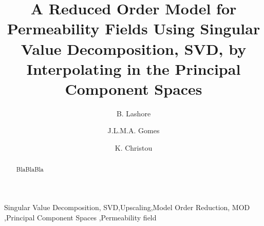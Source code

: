 \documentclass[preprint,12pt]{elsarticle}
\begin{document}
\begin{frontmatter}



\title{A Reduced Order Model for Permeability Fields Using Singular Value Decomposition, SVD, by Interpolating in the Principal Component Spaces}
\author[UoA]{B. Lashore} \author[UoA]{J.L.M.A. Gomes} \author[UoA]{K. Christou}
\address[UoA]{Mechanics of Fluids, Soils \& Structures Group, School of Engineering, University of Aberdeen, UK}


\begin{abstract}
  BlaBlaBla
\end{abstract}



\begin{keyword} %
Singular Value Decomposition, SVD\sep Upscaling\sep Model Order Reduction, MOD \sep  Principal Component Spaces \sep Permeability field
\end{keyword}
 
\end{frontmatter}

\end{document}

